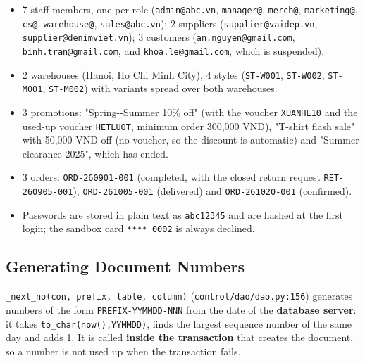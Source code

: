 \begin{itemize}
\tightlist
\item
  7 staff members, one per role (\texttt{admin@abc.\allowbreak{}vn},
  \texttt{manager@}, \texttt{merch@}, \texttt{marketing@}, \texttt{cs@},
  \texttt{warehouse@}, \texttt{sales@abc.\allowbreak{}vn}); 2 suppliers
  (\texttt{supplier@vaidep.\allowbreak{}vn}, \texttt{supplier@denimviet.\allowbreak{}vn}); 3
  customers (\texttt{an.\allowbreak{}nguyen@gmail.\allowbreak{}com}, \texttt{binh.\allowbreak{}tran@gmail.\allowbreak{}com},
  and \texttt{khoa.\allowbreak{}le@gmail.\allowbreak{}com}, which is suspended).
\item
  2 warehouses (Hanoi, Ho Chi Minh City), 4 styles (\texttt{ST-W001},
  \texttt{ST-W002}, \texttt{ST-M001}, \texttt{ST-M002}) with variants
  spread over both warehouses.
\item
  3 promotions: "Spring-\/-Summer 10\% off" (with the voucher
  \texttt{XUANHE10} and the used-up voucher \texttt{HETLUOT}, minimum
  order 300,000 VND), "T-shirt flash sale" with 50,000 VND off (no
  voucher, so the discount is automatic) and "Summer clearance 2025",
  which has ended.
\item
  3 orders: \texttt{ORD-260901-001} (completed, with the closed return
  request \texttt{RET-260905-001}), \texttt{ORD-261005-001} (delivered)
  and \texttt{ORD-261020-001} (confirmed).
\item
  Passwords are stored in plain text as \texttt{abc12345} and are hashed
  at the first login; the sandbox card \texttt{**** 0002} is always
  declined.
\end{itemize}

\hypertarget{generating-document-numbers}{%
\subsection{Generating Document
Numbers}\label{generating-document-numbers}}

\texttt{\_\allowbreak{}next\_\allowbreak{}no(\allowbreak{}con,\allowbreak{} prefix,\allowbreak{} table,\allowbreak{} column)}
(\texttt{control/\allowbreak{}dao/\allowbreak{}dao.\allowbreak{}py:156}) generates numbers of the form
\texttt{PREFIX-YYMMDD-NNN} from the date of the \textbf{database
server}: it takes
\texttt{to\_\allowbreak{}char(\allowbreak{}now(\allowbreak{}),\allowbreak{}\textquotesingle{}YYMMDD\textquotesingle{})},
finds the largest sequence number of the same day and adds 1. It is
called \textbf{inside the transaction} that creates the document, so a
number is not used up when the transaction fails.

